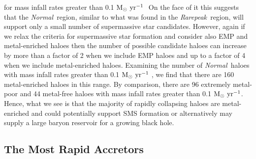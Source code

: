 \documentclass[graphics, twocolumn, usenatbib]{mn2e}
\newcommand{\msolaryr} {$\rm{M_{\odot}~yr^{-1}}~$}
\newcommand{\msolaryrc} {$\rm{M_{\odot}~yr^{-1}}$}
\newcommand{\rarepeak} {\textit{Rarepeak~}}
\newcommand{\normal} {\textit{Normal~}}
\begin{document}
for mass infall rates greater than 0.1 \msolaryr
On the face of it this suggests that the \normal region, similar to what was found in the \rarepeak region, will
support only a small number of supermassive star candidates. However, again
if we relax the criteria for supermassive star formation and consider also EMP and metal-enriched haloes
then the number of possible candidate haloes can increase by more than a factor of 2 when we include EMP haloes
and up to a factor of 4 when we include metal-enriched haloes. 
Examining the number of \normal haloes with mass infall rates greater than 0.1 \msolaryr,
we find that there are 160 metal-enriched haloes in this range.
By comparison, there are 96 extremely metal-poor and 44 metal-free 
haloes with mass infall rates  greater than 0.1 \msolaryrc.
Hence, what we see is that the majority of rapidly collapsing haloes are metal-enriched
and could potentially support SMS formation or 
alternatively may supply a large baryon reservoir for a growing black hole. 


\subsection{The Most Rapid Accretors}
\end{document}
